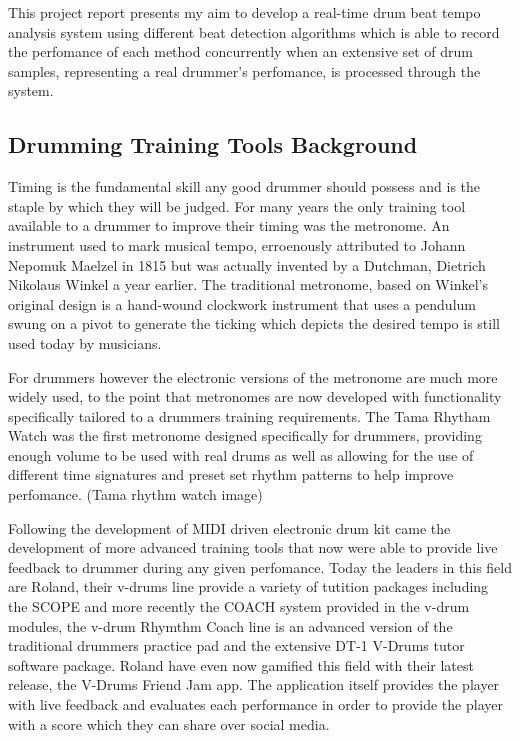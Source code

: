 \documentclass[a4paper, 11pt]{article}
\begin{document}
This project report presents my aim to develop a real-time drum beat tempo analysis system using different beat detection algorithms which is able to record the perfomance of each method concurrently when an extensive set of drum samples, representing a real drummer's perfomance, is processed through the system.

\maketitle{} \subsection{Drumming Training Tools Background}
Timing is the fundamental skill any good drummer should possess and is the staple by which they will be judged. For many years the only training tool available to a drummer to improve their timing was the metronome. An instrument used to mark musical tempo, erroenously attributed to Johann Nepomuk Maelzel in 1815 but was actually invented by a Dutchman, Dietrich Nikolaus Winkel a year earlier. The traditional metronome, based on Winkel's original design is a hand-wound clockwork instrument that uses a pendulum swung on a pivot to generate the ticking which depicts the desired tempo \cite{brit-metro} is still used today by musicians. \par


For drummers however the electronic versions of the metronome are much more widely used, to the point that metronomes are now developed with functionality specifically tailored to a drummers training requirements. The Tama Rhytham Watch was the first metronome designed specifically for drummers, providing enough volume to be used with real drums as well as allowing for the use of different time signatures and preset set rhythm patterns to help improve perfomance. (Tama rhythm watch image) \par

Following the development of MIDI driven electronic drum kit came the development of more advanced training tools that now were able to provide live feedback to drummer during any given perfomance. Today the leaders in this field are Roland, their v-drums line provide a variety of tutition packages including the SCOPE and more recently the COACH system provided in the v-drum modules, the v-drum Rhymthm Coach line is an advanced version of the traditional drummers practice pad and the extensive DT-1 V-Drums tutor software package. Roland have even now gamified this field with their latest release, the V-Drums Friend Jam app. The application itself provides the player with live feedback and evaluates each performance in order to provide the player with a score which they can share over social media. \par
\end{document}
